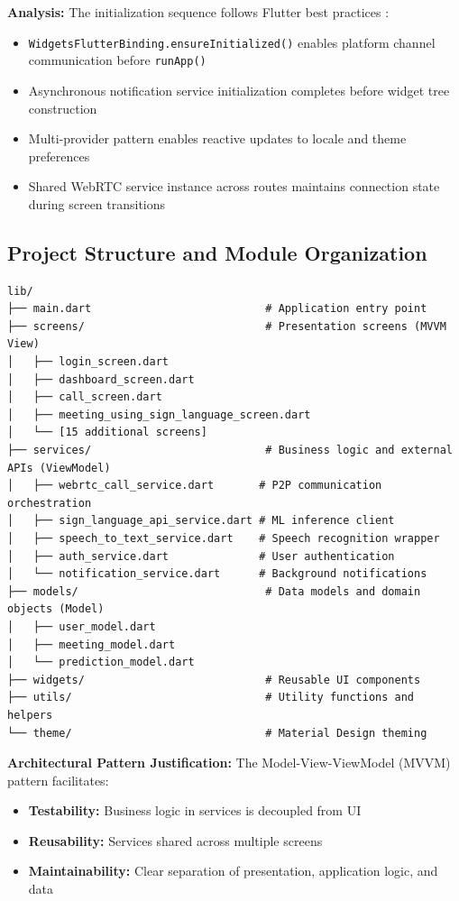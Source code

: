 \documentclass[11pt,a4paper,twoside]{report}
\begin{document}
\textbf{Analysis:} The initialization sequence follows Flutter best practices \cite{Boelens2021}:
\begin{itemize}
    \item \texttt{WidgetsFlutterBinding.ensureInitialized()} enables platform channel communication before \texttt{runApp()}
    \item Asynchronous notification service initialization completes before widget tree construction
    \item Multi-provider pattern enables reactive updates to locale and theme preferences
    \item Shared WebRTC service instance across routes maintains connection state during screen transitions
\end{itemize}

\subsection{Project Structure and Module Organization}
\label{subsec:project-structure}

\begin{verbatim}
lib/
├── main.dart                           # Application entry point
├── screens/                            # Presentation screens (MVVM View)
│   ├── login_screen.dart              
│   ├── dashboard_screen.dart          
│   ├── call_screen.dart               
│   ├── meeting_using_sign_language_screen.dart
│   └── [15 additional screens]
├── services/                           # Business logic and external APIs (ViewModel)
│   ├── webrtc_call_service.dart       # P2P communication orchestration
│   ├── sign_language_api_service.dart # ML inference client
│   ├── speech_to_text_service.dart    # Speech recognition wrapper
│   ├── auth_service.dart              # User authentication
│   └── notification_service.dart      # Background notifications
├── models/                             # Data models and domain objects (Model)
│   ├── user_model.dart
│   ├── meeting_model.dart
│   └── prediction_model.dart
├── widgets/                            # Reusable UI components
├── utils/                              # Utility functions and helpers
└── theme/                              # Material Design theming
\end{verbatim}

\textbf{Architectural Pattern Justification:} The Model-View-ViewModel (MVVM) pattern facilitates:
\begin{itemize}
    \item \textbf{Testability:} Business logic in services is decoupled from UI
    \item \textbf{Reusability:} Services shared across multiple screens
    \item \textbf{Maintainability:} Clear separation of presentation, application logic, and data
\end{itemize}
\end{document}

